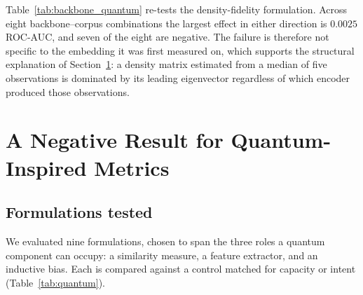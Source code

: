 \documentclass[preprint,12pt]{elsarticle}
\begin{document}
Table~\ref{tab:backbone_quantum} re-tests the density-fidelity formulation.
Across eight backbone--corpus combinations the largest effect in either
direction is $0.0025$ ROC-AUC, and seven of the eight are negative. The failure
is therefore not specific to the embedding it was first measured on, which
supports the structural explanation of Section~\ref{sec:quantum}: a density matrix
estimated from a median of five observations is dominated by its leading
eigenvector regardless of which encoder produced those observations.

\section{A Negative Result for Quantum-Inspired Metrics}
\label{sec:quantum}

\subsection{Formulations tested}

We evaluated nine formulations, chosen to span the three roles a quantum
component can occupy: a similarity measure, a feature extractor, and an
inductive bias. Each is compared against a control matched for capacity or
intent (Table~\ref{tab:quantum}).

\begin{table}[t]
\caption{Quantum-inspired formulations against matched classical controls.}
\label{tab:quantum}
\centering
{}
\end{table}
\end{document}
